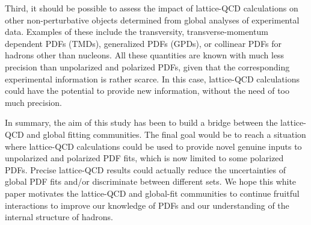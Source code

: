 Third, it should be possible to assess the impact of lattice-QCD 
calculations on other non-perturbative objects
determined from global analyses of experimental data.
%
Examples of these include the transversity, transverse-momentum dependent 
PDFs (TMDs), generalized PDFs (GPDs), or collinear PDFs for hadrons 
other than nucleons.
%
All these quantities are known with much less precision than unpolarized
and polarized PDFs, given that the corresponding experimental information
is rather scarce. 
%
In this case, lattice-QCD calculations could have the potential
to provide new information, without the need of too much precision.

In summary, the aim of this study has been to build a bridge between the 
lattice-QCD and global fitting communities.
%
The final goal would be to reach a situation where lattice-QCD calculations 
could be used to provide novel genuine inputs to unpolarized and polarized 
PDF fits, which is now limited to some polarized PDFs. 
%
Precise lattice-QCD results could actually reduce the uncertainties of
global PDF fits and/or discriminate between different sets.
%
We hope this white paper motivates the lattice-QCD and global-fit
communities to continue fruitful interactions to improve our knowledge of PDFs
and our understanding of the internal structure of hadrons.
